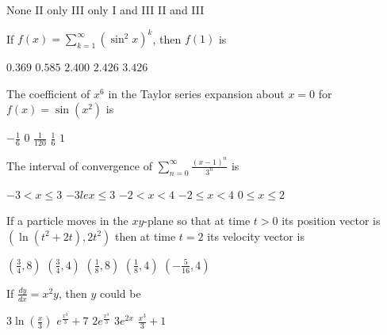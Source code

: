 \begin{questions}
    \begin{oneparchoices}
    \CorrectChoice None
    \choice II only
    \choice III only
    \choice I and III
    \choice II and III
    \end{oneparchoices} 

\question[2] If $f(x) = \sum_{k = 1}^\infty (\sin^2 x)^k$, then $f(1)$ is

    \begin{oneparchoices}
    \choice $0.369$
    \choice $0.585$
    \choice $2.400$
    \CorrectChoice $2.426$
    \choice $3.426$
    \end{oneparchoices}

\question[2] The coefficient of $x^6$ in the Taylor series expansion
    about $x = 0$ for $f(x) = \sin (x^2)$ is

    \begin{oneparchoices}
    \CorrectChoice $-\frac{1}{6}$
    \choice $0$
    \choice $\frac{1}{120}$
    \choice $\frac{1}{6}$
    \choice $1$
    \end{oneparchoices}

\question[2] The interval of convergence of $\sum_{n =
    0}^\infty \frac{ (x-1)^n }{3^n}$ is

    \begin{oneparchoices}
    \choice $-3 < x \le 3$
    \choice $-3 le x \le 3$
    \CorrectChoice $-2 < x < 4$
    \choice $-2 \le x < 4$
    \choice $0 \le x \le 2$
    \end{oneparchoices}

\question[2] If a particle moves in the $xy$-plane so that at time $t
    > 0$ its position vector is $(\ln(t^2 + 2t), 2t^2)$ then at time
      $t = 2$ its velocity vector is

    \begin{oneparchoices}
    \CorrectChoice $(\frac{3}{4}, 8)$
    \choice $(\frac{3}{4}, 4)$
    \choice $(\frac{1}{8}, 8)$
    \choice $(\frac{1}{8}, 4)$
    \choice $(-\frac{5}{16}, 4)$
    \end{oneparchoices}

\question[2] If $\frac{dy}{dx} = x^2y$, then $y$ could be

    \begin{oneparchoices}
    \choice $3\ln(\frac{x}{3})$
    \choice $e^\frac{x^3}{3} + 7$
    \CorrectChoice $2e^\frac{x^3}{3}$
    \choice $3e^{2x}$
    \choice $\frac{x^3}{3} + 1$
    \end{oneparchoices}
\end{questions}


